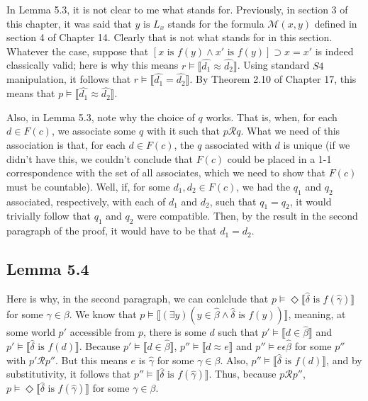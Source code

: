 \documentclass{article}
\newcommand{\lbc}{\llbracket}
\newcommand{\rbc}{\rrbracket}
\theoremstyle{definition}
\begin{document}
In Lemma 5.3, it is not clear to me what  stands for. Previously, in section 3 of this chapter, it was said that 
$y\textrm{ is }L_x$ stands for the formula $\mathcal{M}(x,y)$ defined in section 4 of Chapter 14. Clearly that is not what  stands 
for in this section. Whatever the case, suppose that $[x\textrm{ is }f(y)\wedge x'\textrm{ is }f(y)]\supset x=x'$ is indeed classically valid; 
here is why this means $r\vDash\lbc\hat{d_1}\approx\hat{d_2}\rbc$. Using standard $S4$ manipulation, it follows that 
$r\vDash\lbc\hat{d_1}=\hat{d_2}\rbc$. By Theorem 2.10 of Chapter 17, this means that $p\vDash\lbc\hat{d_1}\approx\hat{d_2}\rbc$.

Also, in Lemma 5.3, note why the choice of $q$ works. That is, when, for each $d\in F(c)$, we associate some 
$q$ with it such that $p\mathcal{R}q$. What we need of this association is that, for each $d\in F(c)$, the $q$ associated with 
$d$ is unique (if we didn't have this, we couldn't conclude that $F(c)$ could be placed in a 1-1 correspondence with 
the set of all associates, which we need to show that $F(c)$ must be countable). Well, if, for some 
$d_1,d_2\in F(c)$, we had the $q_1$ and $q_2$ associated, respectively, with each of $d_1$ and $d_2$, such that 
$q_1=q_2$, it would trivially follow that $q_1$ and $q_2$ were compatible. Then, by the result in the second paragraph of the proof, 
it would have to be that $d_1=d_2$.

\subsection*{Lemma 5.4}
Here is why, in the second paragraph, we can conlclude that 
$p\vDash\Diamond\lbc\hat{\delta}\textrm{ is }f(\hat{\gamma})\rbc$ for some $\gamma\in\beta$. We know that 
$p\vDash\lbc(\exists y)(y\in\hat{\beta}\wedge\hat{\delta}\textrm{ is }f(y))\rbc$, meaning, at some world 
$p'$ accessible from $p$, there is some $d$ such that 
$p'\vDash\lbc d\in\hat{\beta}\rbc$ and $p'\vDash\lbc\hat{\delta}\textrm{ is }f(d)\rbc$. Because 
$p'\vDash\lbc d\in\hat{\beta}\rbc$, $p''\vDash\lbc d\approx e\rbc$ and $p''\vDash e\epsilon\hat{\beta}$ for some $p''$ with 
$p'\mathcal{R}p''$. But this means 
$e$ is $\hat{\gamma}$ for some $\gamma\in\beta$. Also, $p''\vDash\lbc\hat{\delta}\textrm{ is }f(d)\rbc$, and 
by substitutivity, it follows that $p''\vDash\lbc\hat{\delta}\textrm{ is }f(\hat{\gamma})\rbc$. Thus, because $p\mathcal{R}p''$, 
$p\vDash\Diamond\lbc\hat{\delta}\textrm{ is }f(\hat{\gamma})\rbc$ for some $\gamma\in\beta$.
\end{document}
